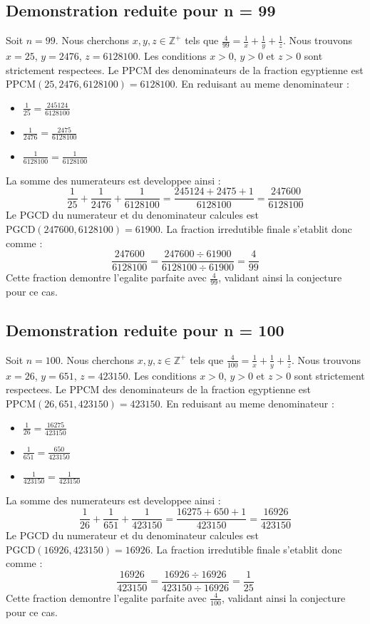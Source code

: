 \documentclass[11pt,a4paper]{article}
\begin{document}
\subsection{Demonstration reduite pour n = 99}
Soit $n = 99$. Nous cherchons $x, y, z \in \mathbb{Z}^{+}$ tels que $\frac{4}{99} = \frac{1}{x} + \frac{1}{y} + \frac{1}{z}$.
Nous trouvons $x = 25$, $y = 2476$, $z = 6128100$.
Les conditions $x > 0$, $y > 0$ et $z > 0$ sont strictement respectees.
Le PPCM des denominateurs de la fraction egyptienne est $\text{PPCM}(25, 2476, 6128100) = 6128100$.
En reduisant au meme denominateur :
\begin{itemize}
    \item $\frac{1}{25} = \frac{245124}{6128100}$
    \item $\frac{1}{2476} = \frac{2475}{6128100}$
    \item $\frac{1}{6128100} = \frac{1}{6128100}$
\end{itemize}
La somme des numerateurs est developpee ainsi :
$$ \frac{1}{25} + \frac{1}{2476} + \frac{1}{6128100} = \frac{245124 + 2475 + 1}{6128100} = \frac{247600}{6128100} $$
Le PGCD du numerateur et du denominateur calcules est $\text{PGCD}(247600, 6128100) = 61900$.
La fraction irredutible finale s'etablit donc comme :
$$ \frac{247600}{6128100} = \frac{247600 \div 61900}{6128100 \div 61900} = \frac{4}{99} $$
Cette fraction demontre l'egalite parfaite avec $\frac{4}{99}$, validant ainsi la conjecture pour ce cas.

\subsection{Demonstration reduite pour n = 100}
Soit $n = 100$. Nous cherchons $x, y, z \in \mathbb{Z}^{+}$ tels que $\frac{4}{100} = \frac{1}{x} + \frac{1}{y} + \frac{1}{z}$.
Nous trouvons $x = 26$, $y = 651$, $z = 423150$.
Les conditions $x > 0$, $y > 0$ et $z > 0$ sont strictement respectees.
Le PPCM des denominateurs de la fraction egyptienne est $\text{PPCM}(26, 651, 423150) = 423150$.
En reduisant au meme denominateur :
\begin{itemize}
    \item $\frac{1}{26} = \frac{16275}{423150}$
    \item $\frac{1}{651} = \frac{650}{423150}$
    \item $\frac{1}{423150} = \frac{1}{423150}$
\end{itemize}
La somme des numerateurs est developpee ainsi :
$$ \frac{1}{26} + \frac{1}{651} + \frac{1}{423150} = \frac{16275 + 650 + 1}{423150} = \frac{16926}{423150} $$
Le PGCD du numerateur et du denominateur calcules est $\text{PGCD}(16926, 423150) = 16926$.
La fraction irredutible finale s'etablit donc comme :
$$ \frac{16926}{423150} = \frac{16926 \div 16926}{423150 \div 16926} = \frac{1}{25} $$
Cette fraction demontre l'egalite parfaite avec $\frac{4}{100}$, validant ainsi la conjecture pour ce cas.
\end{document}
